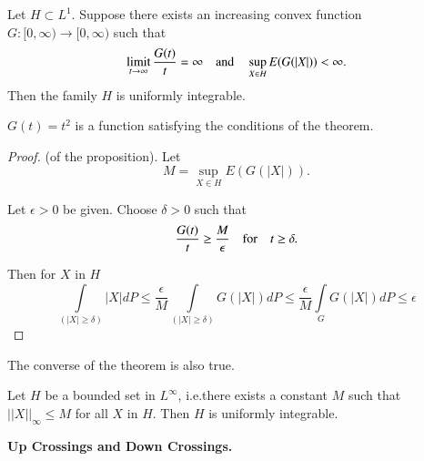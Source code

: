 \begin{prop*}
Let $H\subset L^{1}$. Suppose there exists an increasing convex
function $G:[0,\infty)\to [0,\infty)$ such that 
$$
\operatorname*{limit}\limits_{t\to
      \infty}\dfrac{G(t)}{t}=\infty\quad\text{and}\quad\sup\limits_{X\in
      H}E(G(|X|))<\infty.
$$ 
Then the family $H$ is uniformly integrable.
\end{prop*}

\begin{example*}
$G(t)=t^{2}$ is a function satisfying the conditions of the theorem.
\end{example*}

\begin{proof}
(of the proposition). Let
$$
M=\sup\limits_{X\in H}E(G(|X|)).
$$

Let $\epsilon>0$ be given. Choose $\delta>0$ such that
$$
\frac{G(t)}{t}\geq \frac{M}{\epsilon}\quad\text{for}\quad t\geq \delta.
$$

Then for $X$ in $H$
$$
\int\limits_{(|X|\geq \delta)}|X|dP\leq
\frac{\epsilon}{M}\int\limits_{(|X|\geq \delta)}G(|X|)dP\leq
\frac{\epsilon}{M}\int\limits_{G}G(|X|)dP\leq \epsilon
$$
\end{proof}

\begin{remark*}
The converse of the theorem is also true.
\end{remark*}

\begin{exer*}
Let $H$ be a bounded set in $L^{\infty}$, i.e.\@ there exists a
constant $M$ such that $||X||_{\infty}\leq M$ for all $X$ in $H$. Then
$H$ is uniformly integrable.
\end{exer*}

\noindent
{\bf Up Crossings and Down Crossings.}\pageoriginale



